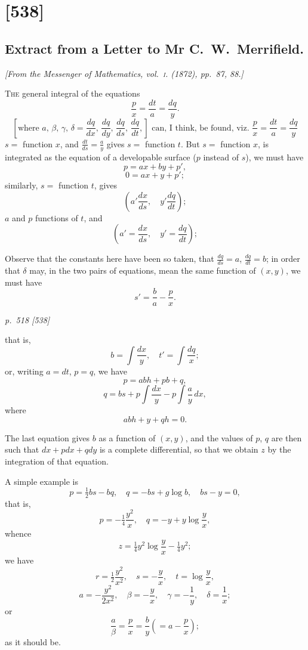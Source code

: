 \documentclass[11pt,a4paper]{article}
\theoremstyle{plain}
\theoremstyle{definition}
\begin{document}
\section{[538]}
\subsection{Extract from a Letter to Mr C.~W.~Merrifield.}

\begin{center}
\textit{[From the Messenger of Mathematics, vol.~\textsc{i}. (1872), pp.~87, 88.]}
\end{center}

\textsc{The} general integral of the equations
\[
\frac{p}{x} = \frac{dt}{a} = \frac{dq}{y}.
\]
\[
\left[ \text{where } a, \, \beta, \, \gamma, \, \delta = \frac{dq}{dx}, \, \frac{dq}{dy}, \, \frac{dq}{ds}, \, \frac{dq}{dt}, \right] \text{ can, I think, be found, viz.\ } \frac{p}{x} = \frac{dt}{a} = \frac{dq}{y}
\]
$s =$ function $x$, and $\frac{dt}{ds} = \frac{a}{y}$ gives $s =$ function $t$. But $s =$ function $x$, is integrated as the equation of a developable surface ($p$ instead of $s$), we must have
\[
p = ax + by + p',
\]
\[
0 = ax + y + p';
\]
similarly, $s =$ function $t$, gives
\[
\left( a' \frac{dx}{ds}, \quad y' \frac{dq}{dt} \right);
\]
$a$ and $p$ functions of $t$, and
\[
\left( a' = \frac{dx}{ds}, \quad y' = \frac{dq}{dt} \right);
\]

Observe that the constants here have been so taken, that $\frac{dq}{ds} = a$, $\frac{dq}{dt} = b$; in order that $\delta$ may, in the two pairs of equations, mean the same function of $(x, y)$, we must have
\[
s' = \frac{b}{a} - \frac{p}{x}.
\]

\clearpage

\bigskip
\textit{p.~518 [538]}
\smallskip

that is,
\[
b = \int \frac{dx}{y}, \quad t' = \int \frac{dq}{x};
\]
or, writing $a = dt$, $p = q$, we have
\[
p = abh + pb + q,
\]
\[
q = bs + p \int \frac{dx}{y} - p \int \frac{a}{y} \, dx,
\]
where
\[
abh + y + qh = 0.
\]

The last equation gives $b$ as a function of $(x, y)$, and the values of $p$, $q$ are then such that $dx + pdx + qdy$ is a complete differential, so that we obtain $z$ by the integration of that equation.

A simple example is
\[
p = \tfrac{1}{2} bs - bq, \quad q = -bs + g \log b, \quad bs - y = 0,
\]
that is,
\[
p = -\tfrac{1}{4} \frac{y^2}{x}, \quad q = -y + y \log \frac{y}{x},
\]
whence
\[
z = \tfrac{1}{4} y^2 \log \frac{y}{x} - \tfrac{1}{4} y^2;
\]
we have
\[
r = \tfrac{1}{2} \frac{y^2}{x^2}, \quad s = -\frac{y}{x}, \quad t = \log \frac{y}{x},
\]
\[
a = -\frac{y^2}{2x^2}, \quad \beta = -\frac{y}{x}, \quad \gamma = -\frac{1}{y}, \quad \delta = \frac{1}{x};
\]
or
\[
\frac{a}{\beta} = \frac{p}{x} = \frac{b}{y} \left( = a - \frac{p}{x} \right);
\]
as it should be.
\end{document}

